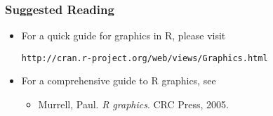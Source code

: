 \documentclass[10pt]{beamer}
\begin{document}
\begin{frame}
\frametitle{Suggested Reading}

\begin{itemize}

\item For a quick guide for graphics in R, please visit

\texttt{http://cran.r-project.org/web/views/Graphics.html}

\item For a comprehensive guide to R graphics, see
  \begin{itemize}
  \item Murrell, Paul. \emph{R graphics}. CRC Press, 2005.
  \end{itemize}

\end{itemize}

\end{frame}
\end{document}
